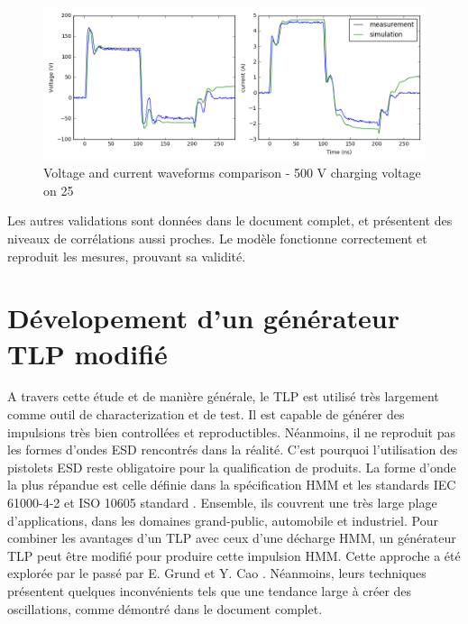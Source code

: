 \begin{figure}[!h]
  \centering
  \includegraphics[width=\textwidth]{src/1/figures/tlp_comparison_R25_500V.png}
  \caption{Voltage and current waveforms comparison - 500 V charging voltage on 25\textOmega{}}
  \label{fig:comparison-tlp-load}
\end{figure}

Les autres validations sont données dans le document complet, et présentent des niveaux de corrélations aussi proches.
Le modèle fonctionne correctement et reproduit les mesures, prouvant sa validité.

\section{Dévelopement d'un générateur TLP modifié}

A travers cette étude et de manière générale, le TLP est utilisé très largement comme outil de characterization et de test.
Il est capable de générer des impulsions très bien controllées et reproductibles.
Néanmoins, il ne reproduit pas les formes d'ondes ESD rencontrés dans la réalité.
C'est pourquoi l'utilisation des pistolets ESD reste obligatoire pour la qualification de produits.
La forme d'onde la plus répandue est celle définie dans la spécification HMM \cite{hmm} et les standards IEC 61000-4-2 \cite{iec61000-4-2} et ISO 10605 standard \cite{iso10605}.
Ensemble, ils couvrent une très large plage d'applications, dans les domaines grand-public, automobile et industriel.
Pour combiner les avantages d'un TLP avec ceux d'une décharge HMM, un générateur TLP peut être modifié pour produire cette impulsion HMM.
Cette approche a été explorée par le passé par E. Grund \cite{iec61000-tlp} et Y. Cao \cite{tlp-based-hmm}.
Néanmoins, leurs techniques présentent quelques inconvénients tels que une tendance large à créer des oscillations, comme démontré dans le document complet.

